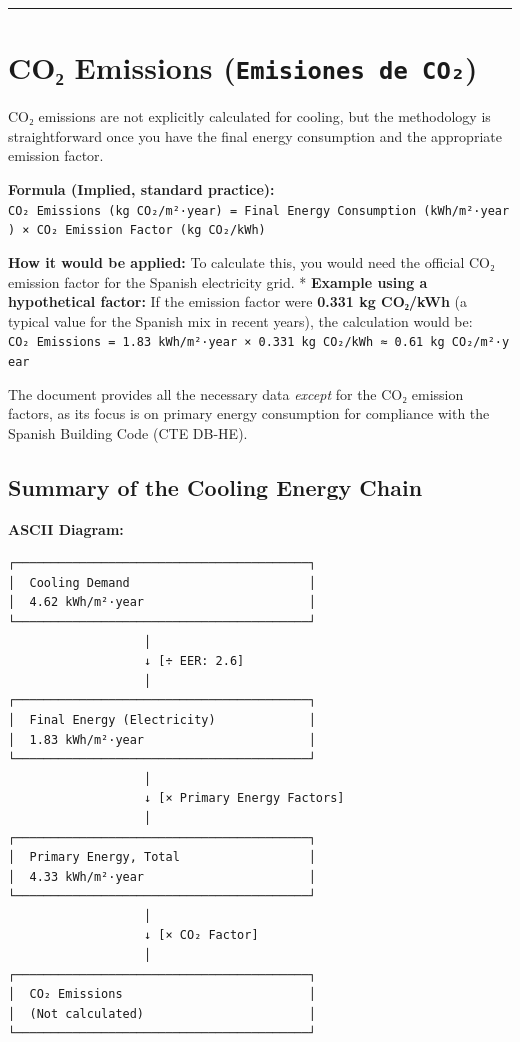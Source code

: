 \documentclass[
  10pt,
  letterpaper,
]{scrbook}
\begin{document}
\begin{center}\rule{0.5\linewidth}{0.5pt}\end{center}

\section{\texorpdfstring{CO₂ Emissions
(\texttt{Emisiones\ de\ CO₂})}{CO₂ Emissions (Emisiones de CO₂)}}\label{coux2082-emissions-emisiones-de-coux2082}

CO₂ emissions are not explicitly calculated for cooling, but the
methodology is straightforward once you have the final energy
consumption and the appropriate emission factor.

\textbf{Formula (Implied, standard practice):}
\texttt{CO₂\ Emissions\ (kg\ CO₂/m²·year)\ =\ Final\ Energy\ Consumption\ (kWh/m²·year)\ ×\ CO₂\ Emission\ Factor\ (kg\ CO₂/kWh)}

\textbf{How it would be applied:} To calculate this, you would need the
official CO₂ emission factor for the Spanish electricity grid. *
\textbf{Example using a hypothetical factor:} If the emission factor
were \textbf{0.331 kg CO₂/kWh} (a typical value for the Spanish mix in
recent years), the calculation would be:
\texttt{CO₂\ Emissions\ =\ 1.83\ kWh/m²·year\ ×\ 0.331\ kg\ CO₂/kWh\ ≈\ 0.61\ kg\ CO₂/m²·year}

The document provides all the necessary data \emph{except} for the CO₂
emission factors, as its focus is on primary energy consumption for
compliance with the Spanish Building Code (CTE DB-HE).

\subsection{Summary of the Cooling Energy
Chain}\label{summary-of-the-cooling-energy-chain}

\textbf{ASCII Diagram:}

\begin{verbatim}
┌─────────────────────────────────────────┐
│  Cooling Demand                         │
│  4.62 kWh/m²·year                       │
└─────────────────────────────────────────┘
                   │
                   ↓ [÷ EER: 2.6]
                   │
┌─────────────────────────────────────────┐
│  Final Energy (Electricity)             │
│  1.83 kWh/m²·year                       │
└─────────────────────────────────────────┘
                   │
                   ↓ [× Primary Energy Factors]
                   │
┌─────────────────────────────────────────┐
│  Primary Energy, Total                  │
│  4.33 kWh/m²·year                       │
└─────────────────────────────────────────┘
                   │
                   ↓ [× CO₂ Factor]
                   │
┌─────────────────────────────────────────┐
│  CO₂ Emissions                          │
│  (Not calculated)                       │
└─────────────────────────────────────────┘
\end{verbatim}
\end{document}
